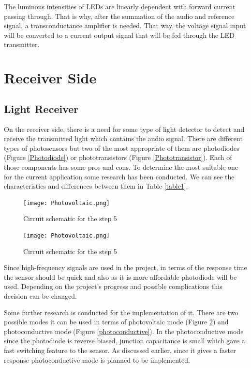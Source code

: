 \documentclass[a4paper,10pt]{IEEEtran}
\begin{document}
The luminous intensities of LEDs are linearly dependent with forward current passing through. That is why, after the summation of the audio and reference signal, a transconductance amplifier is needed. That way, the voltage signal input will be converted to a current output signal that will be fed through the LED transmitter.


\section{Receiver Side}

\subsection{Light Receiver}

On the receiver side, there is a need for some type of light detector to detect and receive the transmitted light which contains the audio signal. There are different types of photosensors but two of the most appropriate of them are photodiodes (Figure \ref*{Photodiode}) or phototransistors (Figure \ref*{Phototransistor}). Each of those components has some pros and cons. To determine the most suitable one for the current application some research has been conducted. We can see the characteristics and differences between them in Table \ref*{table1}. 

\begin{figure}[H]
    \centering
    \texttt{[image: Photovoltaic.png]}
    \caption{Circuit schematic for the step 5}
    \label{photovoltaic}
    \end{figure} 

\begin{figure}[H]
    \centering
    \texttt{[image: Photovoltaic.png]}
    \caption{Circuit schematic for the step 5}
    \label{photovoltaic}
    \end{figure} 


Since high-frequency signals are used in the project, in terms of the response time the sensor should be quick and also as it is more affordable photodiode will be used. Depending on the project's progress and possible complications this decision can be changed. 

Some further research is conducted for the implementation of it. There are two possible modes it can be used in terms of photovoltaic mode (Figure \ref{photovoltaic}) and photoconductive mode (Figure \ref{photoconductive}).  In the photoconductive mode since the photodiode is reverse biased, junction capacitance is small which gave a fast switching feature to the sensor. As discussed earlier, since it gives a faster response photoconductive mode is planned to be implemented.
\end{document}
